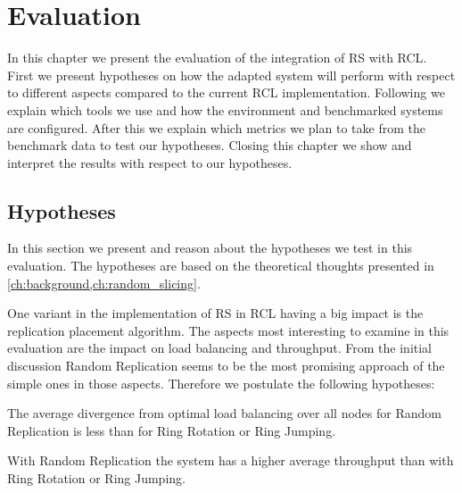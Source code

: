 \chapter{Evaluation}
In this chapter we present the evaluation of the integration of \ac{RS} with \ac{RCL}.
First we present hypotheses on how the adapted system will perform with respect to different aspects compared to the current \ac{RCL} implementation.
Following we explain which tools we use and how the environment and benchmarked systems are configured.
After this we explain which metrics we plan to take from the benchmark data to test our hypotheses.
Closing this chapter we show and interpret the results with respect to our hypotheses.

\section{Hypotheses}
In this section we present and reason about the hypotheses we test in this evaluation.
The hypotheses are based on the theoretical thoughts presented in \cref{ch:background,ch:random_slicing}.

One variant in the implementation of \ac{RS} in \ac{RCL} having a big impact is the replication placement algorithm.
The aspects most interesting to examine in this evaluation are the impact on load balancing and throughput.
From the initial discussion Random Replication seems to be the most promising approach of the simple ones in those aspects.
Therefore we postulate the following hypotheses:
\begin{hypothesis}
\label{hyp:replication_load_balancing}
	The average divergence from optimal load balancing over all nodes for Random Replication is less than for Ring Rotation or Ring Jumping.
\end{hypothesis}
\begin{hypothesis}
\label{hyp:replication_throughput}
	With Random Replication the system has a higher average throughput than with Ring Rotation or Ring Jumping.
\end{hypothesis}

